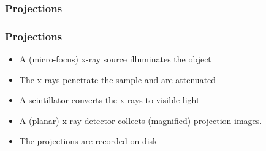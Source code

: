 \begin{frame}
  \frametitle{Projections}
  \centering%
\end{frame}

\begin{frame}
  \frametitle{Projections}
  \begin{itemize}
    \item A (micro-focus) x-ray source illuminates the object
    \item The x-rays penetrate the sample and are attenuated
    \item A scintillator converts the x-rays to visible light
    \item A (planar) x-ray detector collects (magnified) projection images.
    \item The projections are recorded on disk
  \end{itemize}
\end{frame}

